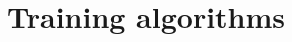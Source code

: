 \documentclass[10pt,compress]{beamer} %
\begin{document}



	


\section{Training algorithms}
\end{document}
